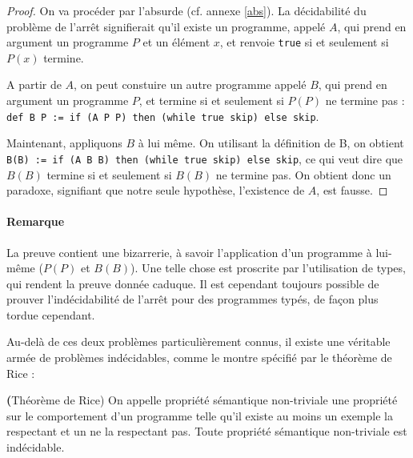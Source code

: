 \begin{proof}
On va procéder par l'absurde (cf. annexe \ref{abs}). La décidabilité du problème de l'arrêt signifierait qu'il existe un programme, appelé $A$, qui prend en argument un programme $P$ et un élément $x$, et renvoie \verb!true! si et seulement si $P(x)$ termine.

A partir de $A$, on peut constuire un autre programme appelé $B$, qui prend en argument un programme $P$, et termine si et seulement si $P(P)$ ne termine pas :\\
\verb!def B P := if (A P P) then (while true skip) else skip!.

Maintenant, appliquons $B$ à lui même. On utilisant la définition de B, on obtient\\ \verb!B(B) := if (A B B) then (while true skip) else skip!, ce qui veut dire que $B(B)$ termine si et seulement si $B(B)$ ne termine pas. On obtient donc un paradoxe, signifiant que notre seule hypothèse, l'existence de $A$, est fausse.
\end{proof}

\paragraph{Remarque} La preuve contient une bizarrerie, à savoir l'application d'un programme à lui-même ($P(P)$ et $B(B)$). Une telle chose est proscrite par l'utilisation de types, qui rendent la preuve donnée caduque. Il est cependant toujours possible de prouver l'indécidabilité de l'arrêt pour des programmes typés, de façon plus tordue cependant.

Au-delà de ces deux problèmes particulièrement connus, il existe une véritable armée de problèmes indécidables, comme le montre spécifié par le théorème de Rice :


\begin{theorem}{\textbf(Théorème de Rice)} On appelle propriété sémantique non-triviale une propriété sur le comportement d'un programme telle qu'il existe au moins un exemple la respectant et un ne la respectant pas. Toute propriété sémantique non-triviale est indécidable.
\end{theorem}

